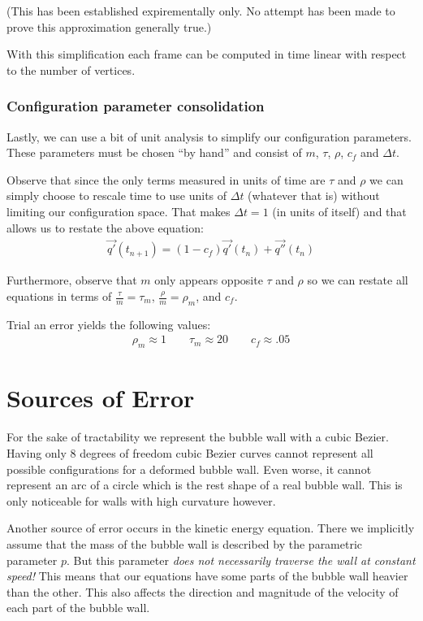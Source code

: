 \documentclass{article}
\begin{document}
(This has been established expirementally only. No attempt has been made to prove this approximation generally true.)

With this simplification each frame can be computed in time linear with respect to the number of vertices.
\subsubsection{Configuration parameter consolidation}
Lastly, we can use a bit of unit analysis to simplify our configuration
parameters. These parameters must be chosen ``by hand'' and consist of $m$,
$\tau$, $\rho$, $c_f$ and $\Delta t$. 

Observe that since the only terms measured in units of time are $\tau$ and
$\rho$ we can simply choose to rescale time to use units of $\Delta t$ 
(whatever that is) without limiting our configuration space. That makes $\Delta
t=1$ (in units of itself) and that allows us to restate the above equation:
\begin{align*}
\vec{q'}(t_{n+1}) = \left(1- c_f\right)\vec{q'}(t_n)+ \vec{q''}(t_n)
\end{align*} 

Furthermore, observe that $m$ only appears opposite $\tau$ and
$\rho$ so we can restate all equations in terms of $\frac{\tau}{m}=\tau_m$,
$\frac{\rho}{m}=\rho_m$, and $c_f$.

Trial an error yields the following values:
\begin{align*}
\rho_m \approx 1 \qquad \tau_m \approx 20 \qquad c_f \approx .05 
\end{align*}
\clearpage
\section{Sources of Error}
For the sake of tractability we represent the bubble wall with a
cubic Bezier. Having only 8 degrees of freedom cubic Bezier curves cannot
represent all possible configurations for a deformed bubble wall. Even
worse, it cannot represent an arc of a circle which is the rest shape of a real
bubble wall. This is only noticeable for walls with high curvature however.

Another source of error occurs in the kinetic energy equation. There we
implicitly assume that the mass of the bubble wall is described by the
parametric parameter $p$. But this parameter \emph{does not necessarily
traverse the wall at constant speed!} This means that our equations have some
parts of the bubble wall heavier than the other. This also affects
the direction and magnitude of the velocity of each part of the bubble wall.
\end{document}
